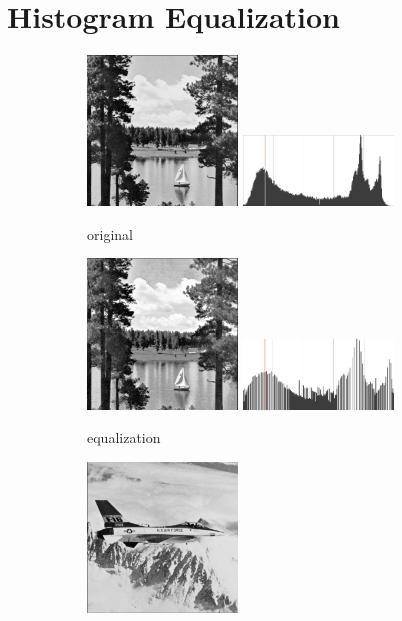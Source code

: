 \documentclass[letterpaper,10pt]{article}
\begin{document}
\section{Histogram Equalization}
\begin{figure}[hbtp]
  \centering
  \begin{subfigure}{4cm}
    \includegraphics[width=4cm]{images/boat.png}
    \includegraphics[width=4cm]{images/boat_hist.png}
    \caption{original}
  \end{subfigure}
  \begin{subfigure}{4cm}
    \includegraphics[width=4cm]{images/boat_equalization.png}
    \includegraphics[width=4cm]{images/boat_equalization_hist.png}
    \caption{equalization}
  \end{subfigure}
  \begin{subfigure}{4cm}
    \includegraphics[width=4cm]{images/f_16.png}

\end{subfigure}
\end{figure}
\end{document}
